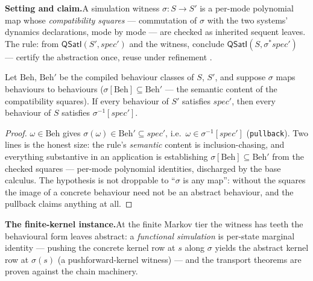 

\textbf{Setting and claim.}\enspace A simulation witness
$\sigma : S \to S'$ is a per-mode polynomial map whose
\emph{compatibility squares} --- commutation of $\sigma$ with the two
systems' dynamics declarations, mode by mode --- are checked as
inherited sequent leaves. The rule: from
$\mathsf{QSatI}(S', \mathit{spec}')$ and the witness, conclude
$\mathsf{QSatI}(S, \sigma^{*}\mathit{spec}')$ --- certify the
abstraction once, reuse under refinement \cite{lynchvaandrager1995,
capuccimyers2026}.

\begin{bthm}\label{thm:qst-pullback}
Let $\mathrm{Beh}$, $\mathrm{Beh}'$ be the compiled behaviour classes
of $S$, $S'$, and suppose $\sigma$ maps behaviours to behaviours
($\sigma[\mathrm{Beh}] \subseteq \mathrm{Beh}'$ --- the semantic
content of the compatibility squares). If every behaviour of $S'$
satisfies $\mathit{spec}'$, then every behaviour of $S$ satisfies
$\sigma^{-1}[\mathit{spec}']$.
\end{bthm}
\begin{proof}
$\omega \in \mathrm{Beh}$ gives
$\sigma(\omega) \in \mathrm{Beh}' \subseteq \mathit{spec}'$, i.e.\
$\omega \in \sigma^{-1}[\mathit{spec}']$
(\texttt{pullback}). Two lines is the honest size: the rule's
\emph{semantic} content is inclusion-chasing, and everything
substantive in an application is establishing
$\sigma[\mathrm{Beh}] \subseteq \mathrm{Beh}'$ from the checked
squares --- per-mode polynomial identities, discharged by the base
calculus. The hypothesis is not droppable to
``$\sigma$ is any map'': without the squares the image of a concrete
behaviour need not be an abstract behaviour, and the pullback claims
anything at all.
\end{proof}

\textbf{The finite-kernel instance.}\enspace At the finite Markov
tier the witness has teeth the behavioural form leaves abstract: a
\emph{functional simulation} is per-state marginal identity ---
pushing the concrete kernel row at $s$ along $\sigma$ yields the
abstract kernel row at $\sigma(s)$ (a pushforward-kernel witness) ---
and the transport theorems are proven against the chain machinery.


